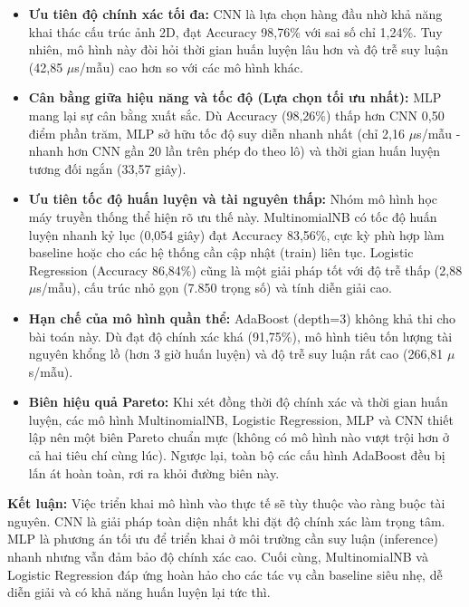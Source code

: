 \documentclass[11pt,a4paper]{article}
\begin{document}
\begin{itemize}
    \item \textbf{Ưu tiên độ chính xác tối đa:} CNN là lựa chọn hàng đầu nhờ khả năng khai thác cấu trúc ảnh 2D, đạt Accuracy 98,76\% với sai số chỉ 1,24\%. Tuy nhiên, mô hình này đòi hỏi thời gian huấn luyện lâu hơn và độ trễ suy luận (42,85 $\mu$s/mẫu) cao hơn so với các mô hình khác.
    
    \item \textbf{Cân bằng giữa hiệu năng và tốc độ (Lựa chọn tối ưu nhất):} MLP mang lại sự cân bằng xuất sắc. Dù Accuracy (98,26\%) thấp hơn CNN 0,50 điểm phần trăm, MLP sở hữu tốc độ suy diễn nhanh nhất (chỉ 2,16 $\mu$s/mẫu - nhanh hơn CNN gần 20 lần trên phép đo theo lô) và thời gian huấn luyện tương đối ngắn (33,57 giây).
    
    \item \textbf{Ưu tiên tốc độ huấn luyện và tài nguyên thấp:} Nhóm mô hình học máy truyền thống thể hiện rõ ưu thế này. MultinomialNB có tốc độ huấn luyện nhanh kỷ lục (0,054 giây) đạt Accuracy 83,56\%, cực kỳ phù hợp làm baseline hoặc cho các hệ thống cần cập nhật (train) liên tục. Logistic Regression (Accuracy 86,84\%) cũng là một giải pháp tốt với độ trễ thấp (2,88 $\mu$s/mẫu), cấu trúc nhỏ gọn (7.850 trọng số) và tính diễn giải cao.
    
    \item \textbf{Hạn chế của mô hình quần thể:} AdaBoost (depth=3) không khả thi cho bài toán này. Dù đạt độ chính xác khá (91,75\%), mô hình tiêu tốn lượng tài nguyên khổng lồ (hơn 3 giờ huấn luyện) và độ trễ suy luận rất cao (266,81 $\mu$s/mẫu).
    
    \item \textbf{Biên hiệu quả Pareto:} Khi xét đồng thời độ chính xác và thời gian huấn luyện, các mô hình MultinomialNB, Logistic Regression, MLP và CNN thiết lập nên một biên Pareto chuẩn mực (không có mô hình nào vượt trội hơn ở cả hai tiêu chí cùng lúc). Ngược lại, toàn bộ các cấu hình AdaBoost đều bị lấn át hoàn toàn, rơi ra khỏi đường biên này.
\end{itemize}

\vspace{0.3cm}
\noindent\textbf{Kết luận:} Việc triển khai mô hình vào thực tế sẽ tùy thuộc vào ràng buộc tài nguyên. CNN là giải pháp toàn diện nhất khi đặt độ chính xác làm trọng tâm. MLP là phương án tối ưu để triển khai ở môi trường cần suy luận (inference) nhanh nhưng vẫn đảm bảo độ chính xác cao. Cuối cùng, MultinomialNB và Logistic Regression đáp ứng hoàn hảo cho các tác vụ cần baseline siêu nhẹ, dễ diễn giải và có khả năng huấn luyện lại tức thì.
\end{document}
